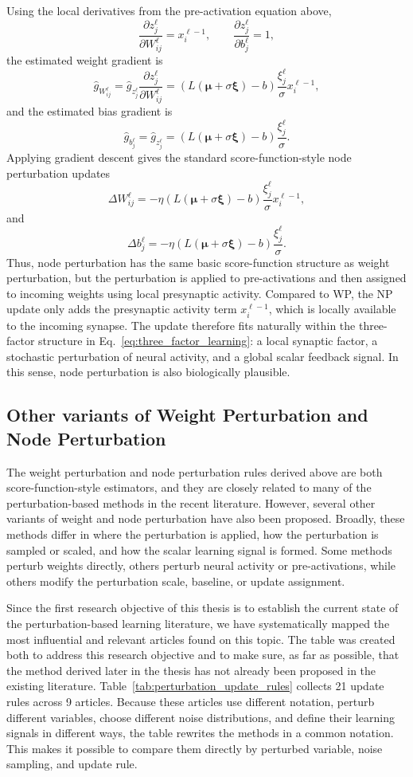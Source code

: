 Using the local derivatives from the pre-activation equation above,
\[
\frac{\partial z^\ell_j}{\partial W^\ell_{ij}}
=
x^{\ell-1}_i,
\qquad
\frac{\partial z^\ell_j}{\partial b^\ell_j}
=
1,
\]
the estimated weight gradient is
\[
\widehat{g}_{W^\ell_{ij}}
=
\widehat{g}_{z^\ell_j}
\frac{\partial z^\ell_j}{\partial W^\ell_{ij}}
=
(L(\boldsymbol{\mu}+\sigma\boldsymbol{\xi})-b)
\frac{\xi^\ell_j}{\sigma}
x^{\ell-1}_i,
\]
and the estimated bias gradient is
\[
\widehat{g}_{b^\ell_j}
=
\widehat{g}_{z^\ell_j}
=
(L(\boldsymbol{\mu}+\sigma\boldsymbol{\xi})-b)
\frac{\xi^\ell_j}{\sigma}.
\]
Applying gradient descent gives the standard score-function-style node perturbation updates
\[
\Delta W^\ell_{ij}
=
-\eta
(L(\boldsymbol{\mu}+\sigma\boldsymbol{\xi})-b)
\frac{\xi^\ell_j}{\sigma}
x^{\ell-1}_i,
\]
and
\[
\Delta b^\ell_j
=
-\eta
(L(\boldsymbol{\mu}+\sigma\boldsymbol{\xi})-b)
\frac{\xi^\ell_j}{\sigma}.
\]
Thus, node perturbation has the same basic score-function structure as weight perturbation, but the perturbation is applied to pre-activations and then assigned to incoming weights using local presynaptic activity.
Compared to WP, the NP update only adds the presynaptic activity term \(x_i^{\ell-1}\), which is locally available to the incoming synapse. The update therefore fits naturally within the three-factor structure in Eq.~\eqref{eq:three_factor_learning}: a local synaptic factor, a stochastic perturbation of neural activity, and a global scalar feedback signal. In this sense, node perturbation is also biologically plausible.

\subsection{Other variants of Weight Perturbation and Node Perturbation}
The weight perturbation and node perturbation rules derived above are both score-function-style estimators, and they are closely related to many of the perturbation-based methods in the recent literature. However, several other variants of weight and node perturbation have also been proposed. Broadly, these methods differ in where the perturbation is applied, how the perturbation is sampled or scaled, and how the scalar learning signal is formed. Some methods perturb weights directly, others perturb neural activity or pre-activations, while others modify the perturbation scale, baseline, or update assignment. 

Since the first research objective of this thesis is to establish the current state of the perturbation-based learning literature, we have systematically mapped the most influential and relevant articles found on this topic. The table was created both to address this research objective and to make sure, as far as possible, that the method derived later in the thesis has not already been proposed in the existing literature. Table~\ref{tab:perturbation_update_rules} collects 21 update rules across 9 articles. Because these articles use different notation, perturb different variables, choose different noise distributions, and define their learning signals in different ways, the table rewrites the methods in a common notation. This makes it possible to compare them directly by perturbed variable, noise sampling, and update rule.

